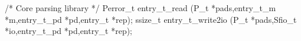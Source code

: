 \begin{code}
/* Core parsing library */
Perror\_t entry\_t\_read (P\_t *pads,entry\_t\_m *m,entry\_t\_pd *pd,entry\_t *rep);
ssize\_t entry\_t\_write2io (P\_t *pads,Sfio\_t *io,entry\_t\_pd *pd,entry\_t *rep);
\end{code}
